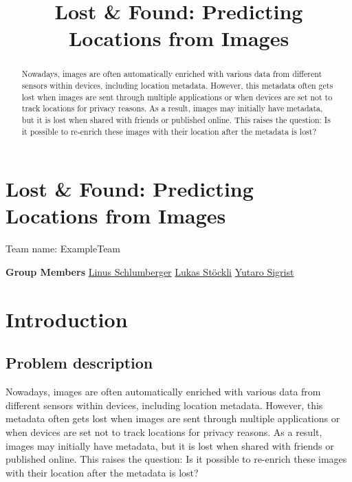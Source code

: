 \documentclass{article}
\title{Lost \& Found: Predicting Locations from Images}
\author{%
}
\begin{document}
\maketitle


\begin{abstract}
    Nowadays, images are often automatically enriched with various data
    from different sensors within devices, including location metadata.
    However, this metadata often gets lost when images are sent through
    multiple applications or when devices are set not to track locations
    for privacy reasons. As a result, images may initially have
    metadata, but it is lost when shared with friends or published
    online. This raises the question: Is it possible to re-enrich these
    images with their location after the metadata is lost?
  \end{abstract}


\section{Lost \& Found: Predicting Locations from
Images}\label{lost-found-predicting-locations-from-images}

Team name: ExampleTeam

\textbf{Group Members} \href{https://gitlab.com/Killusions}{Linus
Schlumberger} \href{https://gitlab.com/Valairaa}{Lukas Stöckli}
\href{https://gitlab.com/yusigrist}{Yutaro Sigrist}

\begin{Shaded}
\begin{Highlighting}[]
\end{Highlighting}
\end{Shaded}

\section{Introduction}\label{introduction}

\subsection{Problem description}\label{problem-description}

Nowadays, images are often automatically enriched with various data from
different sensors within devices, including location metadata. However,
this metadata often gets lost when images are sent through multiple
applications or when devices are set not to track locations for privacy
reasons. As a result, images may initially have metadata, but it is lost
when shared with friends or published online. This raises the question:
Is it possible to re-enrich these images with their location after the
metadata is lost?
\end{document}
